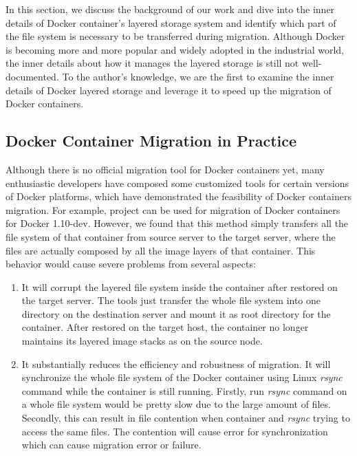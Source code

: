 
In this section, we discuss the background of our work and dive into the inner details of Docker container's layered storage system and identify which part of the file system is necessary to be transferred during migration. 
Although Docker is becoming more and more popular and widely adopted in the industrial world, the inner details about how it manages the layered storage is still not well-documented. 
To the author's knowledge, we are the first to examine the inner details of Docker layered storage and leverage it to speed up the migration of Docker containers.







\subsection{Docker Container Migration in Practice }\label{migpractice}




Although there is no official  migration tool for Docker containers yet, many enthusiastic developers have composed some customized tools for certain versions of Docker platforms, which have demonstrated the feasibility of Docker containers  migration. For example, project \cite{boucherPhaul} 
can be used for migration of Docker containers for Docker 1.10-dev. However, we found that this method simply transfers all the file system of that container from source server to the target server, where the files are actually composed by all the image layers of that container. 
This behavior would cause severe problems from several aspects:
\begin{enumerate}[series = tobecont]
    \item It will corrupt the layered file system inside the container after restored  on the target server. The tools just transfer the whole file system into one directory on the destination server and mount it as root directory for the container. After restored on the target host, the container no longer maintains its layered image stacks as on the source node. 
    \item It substantially reduces the efficiency and robustness of migration.
    It will synchronize the whole file system of the Docker container using Linux \textit{rsync} command while the container is still running. Firstly, run \textit{rsync} command on a whole file system would be pretty slow due to the large amount of files.  Secondly, this can result in file contention when container and \textit{rsync} trying to access the same files. The contention will cause error for synchronization which can cause migration error or failure. 
\end{enumerate}

